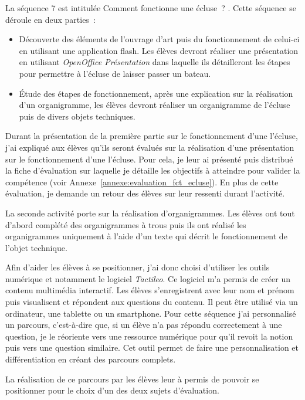 La séquence 7 est intitulée \og Comment fonctionne une écluse~? \fg{}.
Cette séquence se déroule en deux parties~:
\begin{itemize}
\item Découverte des éléments de l'ouvrage d'art puis du fonctionnement de celui-ci en utilisant une application flash. Les élèves devront réaliser une présentation en utilisant \textit{OpenOffice Présentation} dans laquelle ils détailleront les étapes pour permettre à l'écluse de laisser passer un bateau.
\item Étude des étapes de fonctionnement, après une explication sur la réalisation d'un organigramme, les élèves devront réaliser un organigramme de l'écluse puis de divers objets techniques.
\end{itemize} 

Durant la présentation de la première partie sur le fonctionnement d'une l'écluse, j'ai expliqué aux élèves qu'ils seront évalués sur la réalisation d'une présentation sur le fonctionnement d'une l'écluse.
Pour cela, je leur ai présenté puis distribué la fiche d'évaluation sur laquelle je détaille les objectifs à atteindre pour valider la compétence (voir Annexe~\ref{annexe:evaluation_fct_ecluse}).
En plus de cette évaluation, je demande un retour des élèves sur leur ressenti durant l'activité.

La seconde activité porte sur la réalisation d'organigrammes.
Les élèves ont tout d'abord complété des organigrammes à trous puis ils ont réalisé les organigrammes uniquement à l'aide d'un texte qui décrit le fonctionnement de l'objet technique.

Afin d'aider les élèves à se positionner, j'ai donc choisi d'utiliser les outils numérique et notamment le logiciel \textit{Tactileo}. 
Ce logiciel m'a permis de créer un contenu multimédia interactif.
Les élèves s'enregistrent avec leur nom et prénom puis visualisent et répondent aux questions du contenu.
Il peut être utilisé via un ordinateur, une tablette ou un smartphone.
Pour cette séquence j'ai personnalisé un parcours, c'est-à-dire que, si un élève n'a pas répondu correctement à une question, je le réoriente vers une ressource numérique pour qu'il revoit la notion puis vers une question similaire.
Cet outil permet de faire une personnalisation et différentiation en créant des parcours complets.

La réalisation de ce parcours par les élèves leur à permis de pouvoir se positionner pour le choix d'un des deux sujets d'évaluation.

